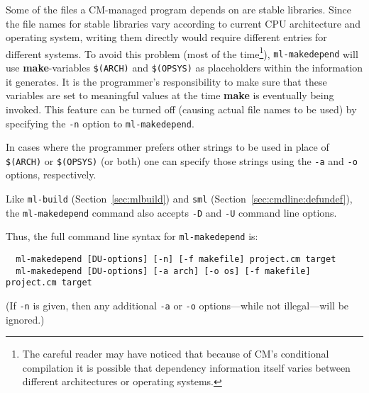 Some of the files a CM-managed program depends on are stable
libraries.  Since the file names for stable libraries vary according
to current CPU architecture and operating system, writing them
directly would require different entries for different systems.  To
avoid this problem (most of the time\footnote{The careful reader may
have noticed that because of CM's conditional compilation it is
possible that dependency information itself varies between different
architectures or operating systems.}), {\tt ml-makedepend} will use
{\bf make}-variables {\tt \$(ARCH)} and {\tt \$(OPSYS)} as
placeholders within the information it generates.  It is the
programmer's responsibility to make sure that these variables are set
to meaningful values at the time {\bf make} is eventually being
invoked.  This feature can be turned off (causing actual file names to
be used) by specifying the {\tt -n} option to {\tt ml-makedepend}.

In cases where the programmer prefers other strings to be used in
place of {\tt \$(ARCH)} or {\tt \$(OPSYS)} (or both) one can specify
those strings using the {\tt -a} and {\tt -o} options, respectively.

Like {\tt ml-build} (Section~\ref{sec:mlbuild}) and {\tt sml}
(Section~\ref{sec:cmdline:defundef}), the {\tt ml-makedepend} command
also accepts {\tt -D} and {\tt -U} command line options.

Thus, the full command line syntax for {\tt ml-makedepend} is:

\begin{verbatim}
  ml-makedepend [DU-options] [-n] [-f makefile] project.cm target
  ml-makedepend [DU-options] [-a arch] [-o os] [-f makefile] project.cm target
\end{verbatim}

(If {\tt -n} is given, then any additional {\tt -a} or {\tt -o}
options---while not illegal---will be ignored.)
